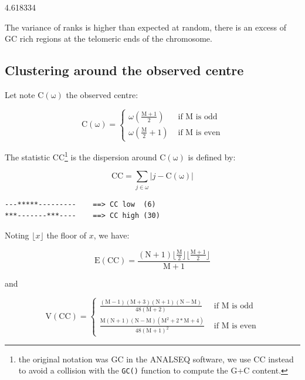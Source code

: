 \documentclass{article}
\begin{document}
\begin{Schunk}
\begin{Soutput}
[1] 4.618334
\end{Soutput}
\end{Schunk}

The variance of ranks is higher than expected at random, there is an excess of GC rich regions
at the telomeric ends of the chromosome.


\subsection{Clustering around the observed centre}

Let note $$ the observed centre:

$$
\mathrm{C(\omega)} = \left\{ \begin{array}{rl}
 \omega\left(\mathrm{\frac{M+1}{2}}\right) &\mbox{ if $\mathrm{M}$ is odd} \\
 \omega\left(\mathrm{\frac{M}{2} + 1}\right) &\mbox{ if $\mathrm{M}$ is even}
       \end{array} \right.
$$

The statistic $$\footnote{
the original notation was GC in the ANALSEQ software, we use CC instead to
avoid a collision with the \texttt{GC()} function to compute the G+C content.
} is the dispersion around $$ is defined by:

$$
\mathrm{CC} = \sum_{j \in \omega}{\left| j - \mathrm{C(\omega)} \right|}
$$

\begin{verbatim}
---*****---------    ==> CC low  (6)
***-------***----    ==> CC high (30)
\end{verbatim}

Noting $\lfloor x \rfloor$ the floor of $x$, we have:

$$
\mathrm{E(CC)} = \mathrm{\frac{(N+1)\lfloor\frac{M}{2}\rfloor\lfloor\frac{M+1}{2}\rfloor}{M+1}}
$$

and

$$
\mathrm{V(CC)} = \left\{ \begin{array}{rl}
 \mathrm{\frac{(M - 1)(M + 3)(N + 1)(N - M)}{48(M + 2)}} &\mbox{ if $\mathrm{M}$ is odd} \\
 \mathrm{\frac{M(N + 1)(N - M)(M^2 + 2*M + 4)}{48(M + 1)^2}} &\mbox{ if $\mathrm{M}$ is even}
       \end{array} \right.
$$
\end{document}
